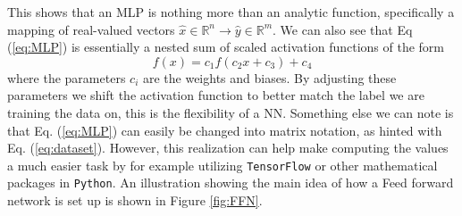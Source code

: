 \documentclass[12pt, a4paper]{book}
\begin{document}
This shows that an MLP is nothing more than an analytic function, specifically a mapping of real-valued vectors $\hat{x}\in\mathbb{R}^n\rightarrow\hat{y}\in\mathbb{R}^m$. We can also see that Eq (\ref{eq:MLP}) is essentially 
a nested sum of scaled activation functions of the form
$$
  f(x)=c_1f(c_2x+c_3)+c_4  
$$
where the parameters $c_i$ are the weights and biases. By adjusting these parameters we shift the activation function to better match the label we are training the data on, this is the flexibility of a NN. 
Something else we can note is that Eq. (\ref{eq:MLP}) can easily be changed into matrix notation, as hinted with Eq. (\ref{eq:dataset}). However, this realization can help make computing the values a much easier 
task by for example utilizing \verb|TensorFlow| \cite{TensorFlow} or other mathematical packages in \verb|Python|. An illustration showing the main idea of how a Feed forward network is set up is shown in Figure \ref{fig:FFN}.
\end{document}
